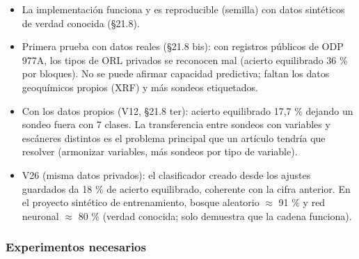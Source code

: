 \documentclass[
  10pt,
]{article}
\providecommand{\tightlist}{%
  \setlength{\itemsep}{0pt}\setlength{\parskip}{0pt}}
\begin{document}
\begin{itemize}
\tightlist
\item
  La implementación funciona y es reproducible (semilla) con datos
  sintéticos de verdad conocida (§21.8).
\item
  Primera prueba con datos reales (§21.8 bis): con registros públicos de
  ODP 977A, los tipos de ORL privados se reconocen mal (acierto
  equilibrado 36 \% por bloques). No se puede afirmar capacidad
  predictiva; faltan los datos geoquímicos propios (XRF) y más sondeos
  etiquetados.
\item
  Con los datos propios (V12, §21.8 ter): acierto equilibrado 17,7 \%
  dejando un sondeo fuera con 7 clases. La transferencia entre sondeos
  con variables y escáneres distintos es el problema principal que un
  artículo tendría que resolver (armonizar variables, más sondeos por
  tipo de variable).
\item
  V26 (misma datos privados): el clasificador creado desde los ajustes
  guardados da 18 \% de acierto equilibrado, coherente con la cifra
  anterior. En el proyecto sintético de entrenamiento, bosque aleatorio
  $\approx$ 91 \% y red neuronal $\approx$ 80 \% (verdad conocida; solo demuestra que la
  cadena funciona).
\end{itemize}

\hypertarget{experimentos-necesarios-2}{%
\subsubsection{Experimentos
necesarios}\label{experimentos-necesarios-2}}
\end{document}
